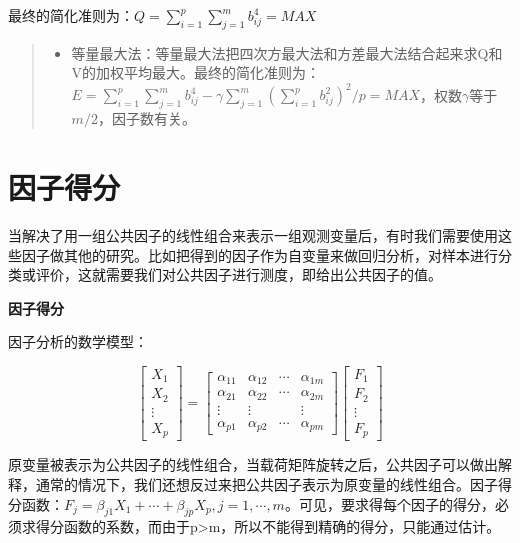 \documentclass[]{ctexbook}
\providecommand{\tightlist}{%
  \setlength{\itemsep}{0pt}\setlength{\parskip}{0pt}}
\begin{document}
最终的简化准则为：\(Q=\sum_{i=1}^p\sum_{j=1}^mb_{ij}^4=MAX\)

\begin{quote}
\begin{itemize}
\tightlist
\item
  等量最大法：等量最大法把四次方最大法和方差最大法结合起来求Q和V的加权平均最大。最终的简化准则为：\(E=\sum_{i=1}^p\sum_{j=1}^mb_{ij}^4-\gamma\sum_{j=1}^m(\sum_{i=1}^pb_{ij}^2)^2/p=MAX\)，权数\(\gamma\)等于\(m/2\)，因子数有关。
\end{itemize}
\end{quote}

\hypertarget{ux56e0ux5b50ux5f97ux5206}{%
\section{因子得分}\label{ux56e0ux5b50ux5f97ux5206}}

当解决了用一组公共因子的线性组合来表示一组观测变量后，有时我们需要使用这些因子做其他的研究。比如把得到的因子作为自变量来做回归分析，对样本进行分类或评价，这就需要我们对公共因子进行测度，即给出公共因子的值。

\textbf{因子得分}

因子分析的数学模型：

\[\begin {bmatrix}X_1\\X_2\\\vdots\\X_p \end {bmatrix}=\begin {bmatrix}\alpha_{11}&\alpha_{12}&\cdots&\alpha_{1m}\\\alpha_{21}&\alpha_{22}&\cdots&\alpha_{2m}\\\vdots&\vdots&&\vdots\\\alpha_{p1}&\alpha_{p2}&\cdots&\alpha_{pm} \end {bmatrix}\begin {bmatrix}F_1\\F_2\\\vdots\\F_p \end {bmatrix}\]

原变量被表示为公共因子的线性组合，当载荷矩阵旋转之后，公共因子可以做出解释，通常的情况下，我们还想反过来把公共因子表示为原变量的线性组合。因子得分函数：\(F_j=\beta_{j1}X_1+\cdots+\beta_{jp}X_p, j=1,\cdots,m\)。可见，要求得每个因子的得分，必须求得分函数的系数，而由于p\textgreater m，所以不能得到精确的得分，只能通过估计。
\end{document}
